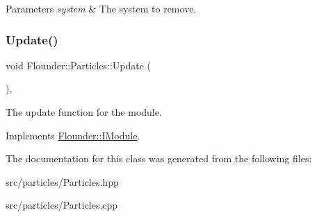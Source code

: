 \begin{DoxyParams}{Parameters}
{\em system} & The system to remove. \\
\hline
\end{DoxyParams}
\mbox{\label{class_flounder_1_1_particles_af57df35b8793f94a31e3c40413ebd29f}} 
\subsubsection{\texorpdfstring{Update()}{Update()}}
{\footnotesize\ttfamily void Flounder\+::\+Particles\+::\+Update (\begin{DoxyParamCaption}{ }\end{DoxyParamCaption})\hspace{0.3cm}{\ttfamily [override]}, {\ttfamily [virtual]}}



The update function for the module. 



Implements \hyperlink{class_flounder_1_1_i_module_a1812bb03a6990e4698a10c043fa25fde}{Flounder\+::\+I\+Module}.



The documentation for this class was generated from the following files\+:\begin{DoxyCompactItemize}
\item 
src/particles/Particles.\+hpp\item 
src/particles/Particles.\+cpp\end{DoxyCompactItemize}
